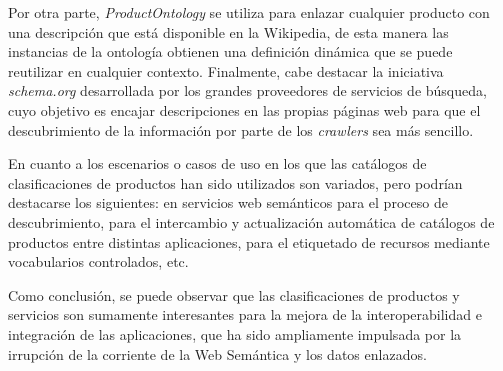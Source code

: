 Por otra parte, \textit{ProductOntology} se utiliza para enlazar cualquier producto con una descripción
que está disponible en la Wikipedia, de esta manera las instancias de la ontología obtienen una
definición dinámica que se puede reutilizar en cualquier contexto. Finalmente, cabe destacar
la iniciativa \textit{schema.org} desarrollada por los grandes proveedores de servicios de búsqueda, 
cuyo objetivo es encajar descripciones en las propias páginas web para que el descubrimiento
de la información por parte de los \textit{crawlers} sea más sencillo.

En cuanto a los escenarios o casos de uso en los que las catálogos de clasificaciones de productos
han sido utilizados son variados, pero podrían destacarse los siguientes: en servicios web semánticos
para el proceso de descubrimiento, para el intercambio y actualización automática de catálogos
de productos entre distintas aplicaciones, para el etiquetado de recursos mediante vocabularios
controlados, etc.

Como conclusión, se puede observar que las clasificaciones de productos y servicios son sumamente interesantes
para la mejora de la interoperabilidad e integración de las aplicaciones, que ha sido ampliamente impulsada por la irrupción de la corriente 
de la Web Semántica y los datos enlazados.




